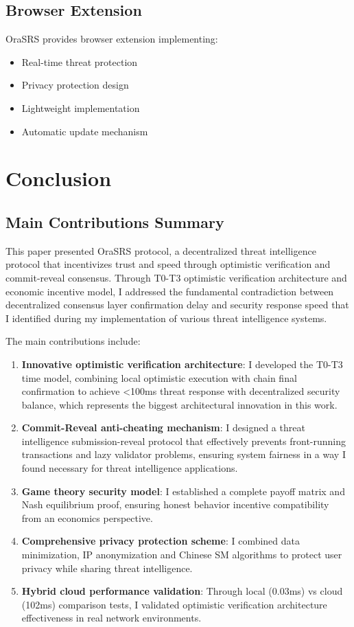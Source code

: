 \documentclass[12pt]{article}
\begin{document}
\subsection{Browser Extension}
OraSRS provides browser extension implementing:
\begin{itemize}
\item Real-time threat protection
\item Privacy protection design
\item Lightweight implementation
\item Automatic update mechanism
\end{itemize}

\section{Conclusion}

\subsection{Main Contributions Summary}

This paper presented OraSRS protocol, a decentralized threat intelligence protocol that incentivizes trust and speed through optimistic verification and commit-reveal consensus. Through T0-T3 optimistic verification architecture and economic incentive model, I addressed the fundamental contradiction between decentralized consensus layer confirmation delay and security response speed that I identified during my implementation of various threat intelligence systems.

The main contributions include:
\begin{enumerate}
\item \textbf{Innovative optimistic verification architecture}: I developed the T0-T3 time model, combining local optimistic execution with chain final confirmation to achieve <100ms threat response with decentralized security balance, which represents the biggest architectural innovation in this work.
\item \textbf{Commit-Reveal anti-cheating mechanism}: I designed a threat intelligence submission-reveal protocol that effectively prevents front-running transactions and lazy validator problems, ensuring system fairness in a way I found necessary for threat intelligence applications.
\item \textbf{Game theory security model}: I established a complete payoff matrix and Nash equilibrium proof, ensuring honest behavior incentive compatibility from an economics perspective.
\item \textbf{Comprehensive privacy protection scheme}: I combined data minimization, IP anonymization and Chinese SM algorithms to protect user privacy while sharing threat intelligence.
\item \textbf{Hybrid cloud performance validation}: Through local (0.03ms) vs cloud (102ms) comparison tests, I validated optimistic verification architecture effectiveness in real network environments.
\end{enumerate}
\end{document}
